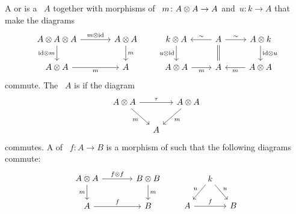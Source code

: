 \documentclass[a4paper,10pt,headings=standardclasses]{scrartcl}
\begin{document}
\begin{definition}
  A  or  is a {\dgv}~$A$ together with morphisms of {\dgv}~$m \colon A \otimes A \to A$ and~$u \colon k \to A$ that make the diagrams
  \[
    \begin{tikzcd}[column sep = large]
      A \tensor A \tensor A
      \arrow{r}[above]{m \tensor {\id}}
      \arrow{d}[left]{{\id} \tensor m}
      &
      A \tensor A
      \arrow{d}[right]{m}
      \\
      A \tensor A
      \arrow{r}[below]{m}
      &
      A
    \end{tikzcd}
    \qquad
    \begin{tikzcd}
      k \tensor A
      \arrow{d}[left]{u \tensor {\id}}
      &
      A
      \arrow{l}[above]{\sim}
      \arrow[equal]{d}
      \arrow{r}[above]{\sim}
      &
      A \tensor k
      \arrow{d}[right]{{\id} \tensor u}
      \\
      A \tensor A
      \arrow{r}[below]{m}
      &
      A
      &
      A \tensor A
      \arrow{l}[below]{m}
    \end{tikzcd}
  \]
  commute.
  The {\dga}~$A$ is  if the diagram
  \[
    \begin{tikzcd}[column sep = small]
      A \tensor A
      \arrow{rr}[above]{\tau}
      \arrow{dr}[below left]{m}
      &
      {}
      &
      A \tensor A
      \arrow{dl}[below right]{m}
      \\
      {}
      &
      A
      &
      {}
    \end{tikzcd}
  \]
  commutes.
  A  of {\dgas}~$f \colon A \to B$ is a morphism of {\dgvs} such that the following diagrams commute:
  \[
    \begin{tikzcd}[column sep = large]
      A \tensor A
      \arrow{r}[above]{f \tensor f}
      \arrow{d}[left]{m}
      &
      B \tensor B
      \arrow{d}[right]{m}
      \\
      A
      \arrow{r}[above]{f}
      &
      B
    \end{tikzcd}
    \qquad
    \begin{tikzcd}[column sep = small]
      {}
      &
      k
      \arrow{dl}[above left]{u}
      \arrow{dr}[above right]{u}
      &
      {}
      \\
      A
      \arrow{rr}[above]{f}
      &
      {}
      &
      B
    \end{tikzcd}
  \]
\end{definition}
\end{document}

